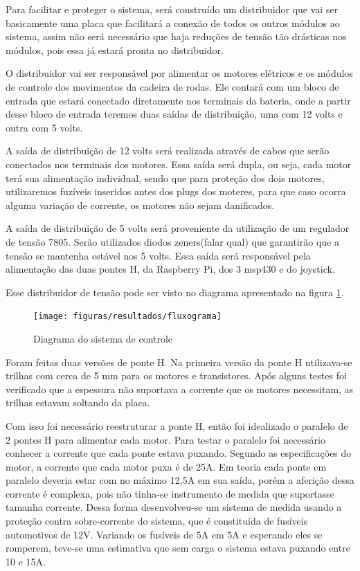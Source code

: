 Para facilitar e proteger o sistema, será construído um distribuidor que vai ser basicamente uma placa que facilitará a conexão de todos os outros módulos ao sistema, assim não será necessário que haja reduções de tensão tão drásticas nos módulos, pois essa já estará pronta no distribuidor.

O distribuidor vai ser responsável por alimentar os motores elétricos e os módulos de controle dos movimentos da cadeira de rodas. Ele contará com um bloco de entrada que estará conectado diretamente nos terminais da bateria, onde a partir desse bloco de entrada teremos duas saídas de distribuição, uma com 12 volts e outra com 5 volts.

A saída de distribuição de 12 volts será realizada através de cabos que serão conectados nos terminais dos motores. Essa saída será dupla, ou seja, cada motor terá sua alimentação individual, sendo que para proteção dos dois motores, utilizaremos fuzíveis inseridos antes dos plugs dos moteres, para que caso ocorra alguma variação de corrente, os motores não sejam danificados.

A saída de distribuição de 5 volts será proveniente da utilização de um regulador de tensão 7805. Serão utilizados diodos zeners(falar qual) que garantirão que a tensão se mantenha estável nos 5 volts. Essa saída será responsável pela alimentação das duas pontes H, da Raspberry Pi, dos 3 msp430 e do joystick.

Esse distribuidor de tensão pode ser visto no diagrama apresentado na figura \ref{fig:diagrama_controle}.

\begin{figure}[!htb]
	\centering
	\texttt{[image: figuras/resultados/fluxograma]}
	\caption{Diagrama do sistema de controle}
	\label{fig:diagrama_controle}
\end{figure}

Foram feitas duas versões de ponte H. Na primeira versão da ponte H utilizava-se trilhas com cerca de 5 mm para os motores e transistores. Após alguns testes foi verificado que a espessura não suportava a corrente que os motores necessitam, as trilhas estavam soltando da placa.

Com isso foi necessário reestruturar a ponte H, então foi idealizado o paralelo de 2 pontes H para alimentar cada motor. Para testar o paralelo foi necessário conhecer a corrente que cada ponte estava puxando. Segundo as especificações do motor, a corrente que cada motor puxa é de 25A. Em teoria cada ponte em paralelo deveria estar com no máximo 12,5A em sua saída, porém a aferição dessa corrente é complexa, pois não tinha-se instrumento de medida que suportasse tamanha corrente. Dessa forma desenvolveu-se um sistema de medida usando a proteção contra sobre-corrente do sistema, que é constituída de fusíveis automotivos de 12V. Variando os fusíveis de 5A em 5A e esperando eles se romperem, teve-se uma estimativa que sem carga o sistema estava puxando entre 10 e 15A.

